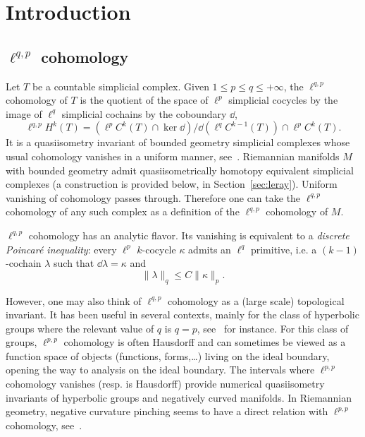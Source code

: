 \section{Introduction}

\subsection{\texorpdfstring{$\ell^{q,p}$}{ell(q,p)} cohomology}

Let $T$ be a countable simplicial complex. Given $1\leq p\leq q\leq +\infty$, the $\ell^{q,p}$ cohomology of $T$ is the quotient of the space of $\ell^p$ simplicial cocycles by the image of $\ell^q$ simplicial cochains by the coboundary $\dd$,
\[
\ell^{q,p}H^k(T)=(\ell^p C^k(T)\cap \ker \dd)/\dd(\ell^q C^{k-1}(T)) \cap \ell^p C^k(T).
\]
It is a quasiisometry invariant of bounded geometry simplicial complexes whose usual cohomology vanishes in a uniform manner, see~\cite{Bourdon-Pajot,Elek,Genton,Gromov,Pansu2}. Riemannian manifolds $M$ with bounded geometry admit quasiisometrically homotopy equivalent simplicial complexes (a construction is provided below, in Section~\ref{sec:leray}). Uniform vanishing of cohomology passes through. Therefore one can take the $\ell^{q,p}$ cohomology of any such complex as a definition of the $\ell^{q,p}$ cohomology of $M$.

$\ell^{q,p}$ cohomology has an analytic flavor. Its vanishing is equivalent to a \emph{discrete Poincar\'e inequality}: every $\ell^p$ $k$-cocycle $\kappa$ admits an $\ell^q$ primitive, i.e. a $(k-1)$-cochain $\lambda$ such that $\dd\lambda=\kappa$ and
\begin{equation}\label{eq:1}
\|\lambda\|_q \leq C \|\kappa\|_p.
\end{equation}

However, one may also think of $\ell^{q,p}$ cohomology as a (large scale) topological invariant. It has been useful in several contexts, mainly for the class of hyperbolic groups where the relevant value of $q$ is $q=p$, see~\cite{Bourdon-Kleiner,Bourdon-Pajot, Cornulier-Tessera,Drutu-Mackay} for instance. For this class of groups, $\ell^{p,p}$ cohomology is often Hausdorff and can sometimes be viewed as a function space of objects (functions, forms,\dots) living on the ideal boundary, opening the way to analysis on the ideal boundary. The intervals where $\ell^{p,p}$ cohomology vanishes (resp. is Hausdorff) provide numerical quasiisometry invariants of hyperbolic groups and negatively curved manifolds. In Riemannian geometry, negative curvature pinching seems to have a direct relation with $\ell^{p,p}$ cohomology, see~\cite{Pansu4}.

